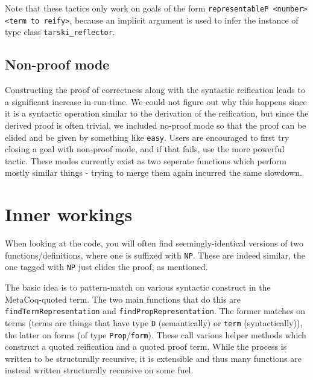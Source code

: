 \documentclass[11pt,a4paper]{article}
\begin{document}
Note that these tactics only work on goals of the form \lstinline|representableP <number> <term to reify>|, because an implicit argument is used to infer the instance of type class \lstinline|tarski_reflector|.

\subsection{Non-proof mode}
Constructing the proof of correctness along with the syntactic reification leads to a significant increase in run-time. We could not figure out why this happens since it is a syntactic operation similar to the derivation of the reification, but since the derived proof is often trivial, we included no-proof mode so that the proof can be elided and be given by something like \lstinline|easy|. Users are encouraged to first try closing a goal with non-proof mode, and if that fails, use the more powerful tactic. These modes currently exist as two seperate functions which perform mostly similar things - trying to merge them again incurred the same slowdown.
\newpage
\section{Inner workings}
When looking at the code, you will often find seemingly-identical versions of two functions/definitions, where one is suffixed with \lstinline|NP|. These are indeed similar, the one tagged with \lstinline|NP| just elides the proof, as mentioned.

The basic idea is to pattern-match on various syntactic construct in the MetaCoq-quoted term. The two main functions that do this are \lstinline|findTermRepresentation| and \lstinline|findPropRepresentation|. The former matches on terms (terms are things that have type \lstinline|D| (semantically) or \lstinline|term| (syntactically)), the latter on forms (of type \lstinline|Prop|/\lstinline|form|). These call various helper methods which construct a quoted reification and a quoted proof term. While the process is written to be structurally recursive, it is extensible and thus many functions are instead written structurally recursive on some fuel.
\end{document}
